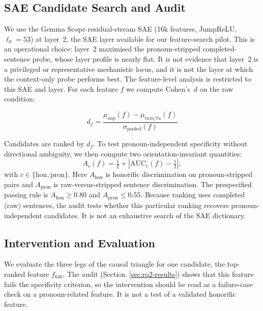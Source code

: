 \documentclass[11pt]{article}
\newcommand{\aap}{\textit{aap}}
\newcommand{\tum}{\textit{tum}}
\newcommand{\tu}{\textit{tu}}
\begin{document}
\subsection{SAE Candidate Search and Audit}
\label{sec:feature-id}

We use the Gemma Scope residual-stream SAE (16k features, JumpReLU,
$\ell_0 = 53$) at layer~2, the SAE layer available for our feature-search
pilot. This is an operational choice: layer~2 maximised the pronoun-stripped
completed-sentence probe, whose layer profile is nearly flat. It is not evidence
that layer~2 is a privileged or representative mechanistic locus, and it is not
the layer at which the context-only probe performs best. The feature-level analysis is restricted
to this SAE and layer. For each feature $f$ we compute Cohen's~$d$ on the raw
condition:

\begin{equation}
  d_f = \frac{\mu_{\aap}(f) - \mu_{\tum/\tu}(f)}{\sigma_\text{pooled}(f)}
  \label{eq:cohend}
\end{equation}

Candidates are ranked by $d_f$. To test pronoun-independent specificity without
directional ambiguity, we then compute two orientation-invariant quantities:
\begin{equation}
 A_c(f)=\tfrac{1}{2}+\left|\mathrm{AUC}_c(f)-\tfrac{1}{2}\right|,
\end{equation}
with $c\in\{\mathrm{hon},\mathrm{pron}\}$. Here $A_{\mathrm{hon}}$ is honorific
discrimination on pronoun-stripped pairs and $A_{\mathrm{pron}}$ is
raw-versus-stripped sentence discrimination. The prespecified passing rule is
$A_{\mathrm{hon}}\geq0.80$ and $A_{\mathrm{pron}}\leq0.55$. Because ranking uses
completed (raw) sentences, the audit tests whether this particular ranking
recovers pronoun-independent candidates. It is not an exhaustive search of the
SAE dictionary.

\subsection{Intervention and Evaluation}
\label{sec:causal-method}

We evaluate the three legs of the causal triangle
\citep{geiger2022causalmedianalysis} for one candidate, the top-ranked feature
$f_{646}$. The audit (Section~\ref{sec:rq2-results}) shows that this feature
fails the specificity criterion, so the intervention should be read as a
failure-case check on a pronoun-related feature. It is not a test of a validated
honorific feature.
\end{document}
